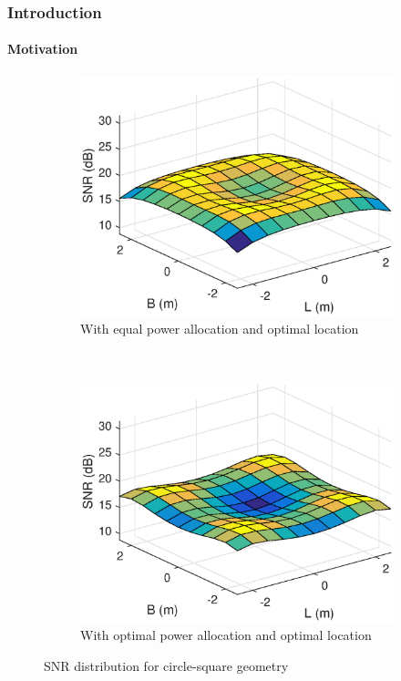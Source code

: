 \documentclass{beamer}
\theoremstyle{remark}
\begin{document}
    
    \begin{frame}
\frametitle{Introduction}
\framesubtitle{Motivation}
\begin{figure}[h!]
    \centering
         \begin{subfigure}[t]{0.48\columnwidth}
        \centering
        \includegraphics[width=\columnwidth]{cirsqNoPowerDist_new}
        \caption{With equal power allocation and optimal location}
\label{fig2:subfig3}     
    \end{subfigure}%
~ 
    \begin{subfigure}[t]{0.48\columnwidth}
        \centering
        \includegraphics[width=\columnwidth]{cirsqPowerDist_new}
        \caption{With optimal power allocation and optimal location}
\label{fig2:subfig4}
    \end{subfigure}
    \caption{SNR distribution for circle-square geometry}
    \label{fig:SNRDistCirsq}
\end{figure}
\end{frame}
\end{document}
